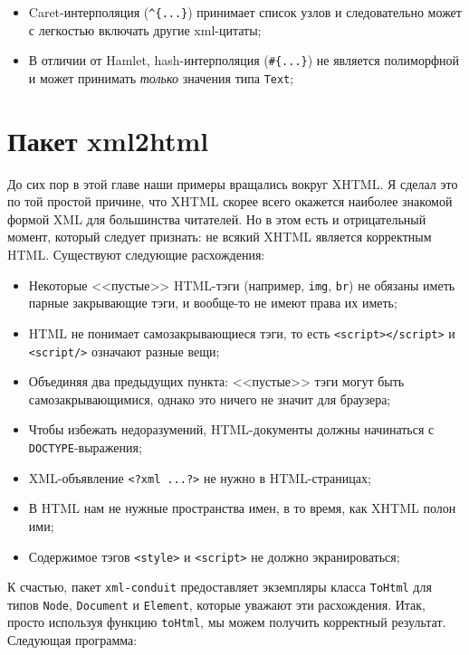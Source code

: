 \begin{itemize}
\item Caret-интерполяция (\verb'^{...}') принимает список узлов и следовательно может с легкостью включать другие xml-цитаты;
\item В отличии от Hamlet, hash-интерполяция (\verb'#{...}') не является полиморфной и может принимать \emph{только} значения типа \lstinline!Text!;
\end{itemize}

\section{Пакет xml2html}

До сих пор в этой главе наши примеры вращались вокруг XHTML. Я сделал это по той простой причине, что XHTML скорее всего окажется наиболее знакомой формой XML для большинства читателей. Но в этом есть и отрицательный момент, который следует признать: не всякий XHTML является корректным HTML. Существуют следующие расхождения:

\begin{itemize}
\item Некоторые <<пустые>> HTML-тэги (например, \lstinline!img!, \lstinline!br!) не обязаны иметь парные закрывающие тэги, и вообще-то не имеют права их иметь;
\item HTML не понимает самозакрывающиеся тэги, то есть \lstinline!<script></script>! и \lstinline!<script/>! означают разные вещи;
\item Объединяя два предыдущих пункта: <<пустые>> тэги могут быть самозакрывающимися, однако это ничего не значит для браузера;
\item Чтобы избежать недоразумений, HTML-документы должны начинаться с \lstinline!DOCTYPE!-выражения;
\item XML-объявление \lstinline!<?xml ...?>! не нужно в HTML-страницах;
\item В HTML нам не нужные пространства имен, в то время, как XHTML полон ими;
\item Содержимое тэгов \lstinline!<style>! и \lstinline!<script>! не должно экранироваться; %
\end{itemize}
  
К счастью, пакет \lstinline!xml-conduit! предоставляет экземпляры класса \lstinline!ToHtml! для типов \lstinline!Node!, \lstinline!Document! и \lstinline!Element!, которые уважают эти расхождения. Итак, просто используя функцию \lstinline!toHtml!, мы можем получить корректный результат. Следующая программа:

